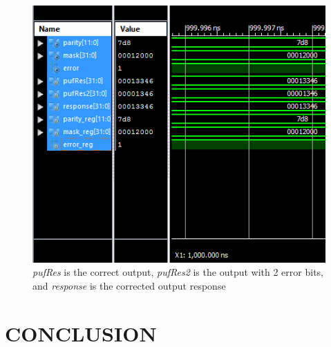 \documentclass[letterpaper, 10 pt, conference]{ieeeconf}  %
\begin{document}
\begin{figure}[thpb]
	\centering
	\includegraphics[scale=.75]{bch}
   \caption{\emph{pufRes} is the correct output, \emph{pufRes2} is the output with 2 error bits, and \emph{response} is the corrected output response}
\end{figure}

\section{CONCLUSION}


\addtolength{\textheight}{-12cm}   %








\end{document}
